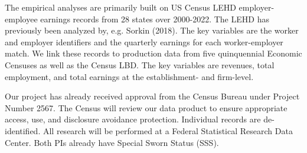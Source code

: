 \documentclass[11pt]{article}
\begin{document}
The empirical analyses are primarily built on US Census LEHD employer-employee earnings records from 28 states over 2000-2022. The LEHD has previously been analyzed by, e.g. Sorkin (2018). The key variables are the worker and employer identifiers and the quarterly earnings for each worker-employer match. We link these records to production data from five quinquennial Economic Censuses as well as the Census LBD. The key variables are revenues, total employment, and total earnings at the establishment- and firm-level. 

Our project has already received approval from the Census Bureau under Project Number 2567. The Census will review our data product to ensure appropriate access, use, and disclosure avoidance protection. Individual records are de-identified. All research will be performed at a Federal Statistical Research Data Center. Both PIs already have Special Sworn Status (SSS).  




\end{document}
